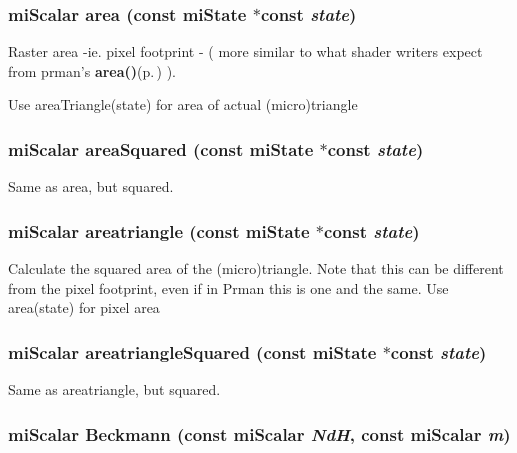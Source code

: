 \subsubsection{\setlength{\rightskip}{0pt plus 5cm}mi\-Scalar area (const mi\-State $\ast$const {\em state})\hspace{0.3cm}{\tt  [inline]}}\label{namespacemr_a30}


Raster area -ie. pixel footprint - ( more similar to what shader writers expect from prman's {\bf area()}{\rm (p.\,\pageref{namespacemr_a30})} ).

Use area\-Triangle(state) for area of actual (micro)triangle 
\subsubsection{\setlength{\rightskip}{0pt plus 5cm}mi\-Scalar area\-Squared (const mi\-State $\ast$const {\em state})\hspace{0.3cm}{\tt  [inline]}}\label{namespacemr_a31}


Same as area, but squared. 

\subsubsection{\setlength{\rightskip}{0pt plus 5cm}mi\-Scalar areatriangle (const mi\-State $\ast$const {\em state})\hspace{0.3cm}{\tt  [inline]}}\label{namespacemr_a33}


Calculate the squared area of the (micro)triangle. Note that this can be different from the pixel footprint, even if in Prman this is one and the same. Use area(state) for pixel area 
\subsubsection{\setlength{\rightskip}{0pt plus 5cm}mi\-Scalar areatriangle\-Squared (const mi\-State $\ast$const {\em state})\hspace{0.3cm}{\tt  [inline]}}\label{namespacemr_a34}


Same as areatriangle, but squared. 

\subsubsection{\setlength{\rightskip}{0pt plus 5cm}mi\-Scalar Beckmann (const mi\-Scalar {\em Nd\-H}, const mi\-Scalar {\em m})\hspace{0.3cm}{\tt  [inline]}}\label{namespacemr_a76}


